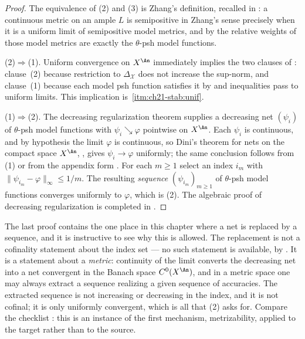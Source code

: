 \begin{proof}
The equivalence of (2) and (3) is Zhang's definition, recalled in
: a continuous metric on an ample $L$ is
semipositive in Zhang's sense precisely when it is a uniform limit of
semipositive model metrics, and by
 the relative weights of those model
metrics are exactly the $\theta$-psh model functions.

(2)$\Rightarrow$(1).  Uniform convergence on $X^{\An}$
immediately implies the two clauses of : clause~(2)
because restriction to $\Delta_{\mathcal X}$ does not increase the
sup-norm, and clause~(1) because each model psh function satisfies it by
 and inequalities pass to uniform
limits.  This implication is
\,\cref{itm:ch21-stab:unif}.

(1)$\Rightarrow$(2).  The decreasing regularization theorem
 supplies a decreasing net
$(\psi_i)$ of $\theta$-psh model functions with
$\psi_i\searrow\varphi$ pointwise on $X^{\An}$.  Each $\psi_i$ is
continuous, and by hypothesis the limit $\varphi$ is continuous, so
Dini's theorem for nets on the compact space
$X^{\An}$, , gives $\psi_i\to\varphi$ uniformly;
the same conclusion follows from \,(1) or from the
appendix form .  For each $m\geq1$ select an index
$i_m$ with $\lVert\psi_{i_m}-\varphi\rVert_\infty\leq1/m$.  The
resulting \emph{sequence} $(\psi_{i_m})_{m\geq1}$ of $\theta$-psh model
functions converges uniformly to $\varphi$, which is (2).  The algebraic
proof of decreasing regularization is completed in
.
\end{proof}

\begin{remark}
\label{rem:ch21-net-to-sequence}
The last proof contains the one place in this chapter where a net is
replaced by a sequence, and it is instructive to see why this is allowed.
The replacement is not a cofinality statement about the index set --- no
such statement is available, by .  It is
a statement about a \emph{metric}: continuity of the limit converts the
decreasing net into a net convergent in the Banach space
$C^0(X^{\An})$, and in a metric space one may always extract a sequence
realizing a given sequence of accuracies.  The extracted sequence is not
increasing or decreasing in the index, and it is not cofinal; it is only
uniformly convergent, which is all that (2) asks for.  Compare the
checklist : this is an instance of the
first mechanism, metrizability, applied to the target rather than to the
source.
\end{remark}

